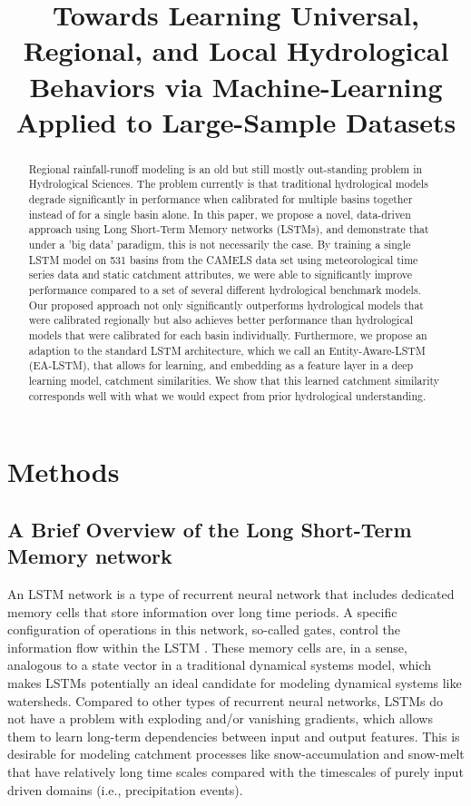 \title{Towards Learning Universal, Regional, and Local Hydrological Behaviors via Machine-Learning Applied to Large-Sample Datasets}

\begin{abstract}
Regional rainfall-runoff modeling is an old but still mostly out-standing problem in Hydrological Sciences. The problem currently is that traditional hydrological models degrade significantly in performance when calibrated for multiple basins together instead of for a single basin alone. In this paper, we propose a novel, data-driven approach using Long Short-Term Memory networks (LSTMs), and demonstrate that under a 'big data' paradigm, this is not necessarily the case. By training a single LSTM model on 531 basins from the CAMELS data set using meteorological time series data and static catchment attributes, we were able to significantly improve performance compared to a set of several different hydrological benchmark models. Our proposed approach not only significantly outperforms hydrological models that were calibrated regionally but also achieves better performance than hydrological models that were calibrated for each basin individually. Furthermore, we propose an adaption to the standard LSTM architecture, which we call an Entity-Aware-LSTM (EA-LSTM), that allows for learning, and embedding as a feature layer in a deep learning model, catchment similarities. We show that this learned catchment similarity corresponds well with what we would expect from prior hydrological understanding.
\end{abstract}

\section{Methods}\label{sec-methods}
\subsection{A Brief Overview of the Long Short-Term Memory network}

An \gls{LSTM} network is a type of recurrent neural network that  includes dedicated memory cells that store information over long time periods. A specific configuration of operations in this network, so-called gates, control the information flow within the \gls{LSTM} \citep{hochreiter1991untersuchungen,hochreiter1997long}. These memory cells are, in a sense, analogous to a state vector in a traditional dynamical systems model, which makes \glspl{LSTM} potentially an ideal candidate for modeling dynamical systems like watersheds. Compared to other types of recurrent neural networks, \glspl{LSTM} do not have a problem with exploding and/or vanishing gradients, which allows them to learn long-term dependencies between input and output features. This is desirable for modeling catchment processes like snow-accumulation and snow-melt that have relatively long time scales compared with the timescales of purely input driven domains (i.e., precipitation events).

